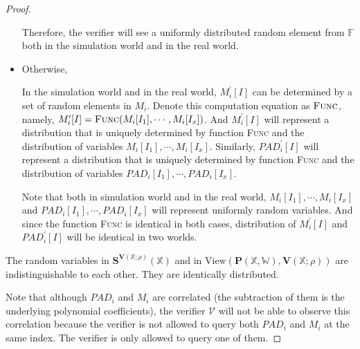 \begin{proof}
\begin{itemize}
    Therefore, the verifier will see a uniformly distributed random element from $\mathbb{F}$ both in the simulation world and in the real world.
    
    \item Otherwise,
    
    In the simulation world and in the real world, $M_i^\prime[I]$ can be determined by a set of random elements in $M_i$. Denote this computation equation as $\textsc{Func}$, namely, $M_i^\prime[I] = \textsc{Func}(M_i[I_1], \cdots, M_i[I_x])$. And $M_i^\prime[I]$ will represent a distribution that is uniquely determined by function \textsc{Func} and the distribution of variables $M_i[I_1], \cdots, M_i[I_x]$. Similarly, $PAD_i^\prime[I]$ will represent a distribution that is uniquely determined by function \textsc{Func} and the distribution of variables $PAD_i[I_1], \cdots, PAD_i[I_x]$.
    
    Note that both in simulation world and in the real world, $M_i[I_1], \cdots, M_i[I_x]$ and $PAD_i[I_1], \cdots, PAD_i[I_x]$ will represent uniformly random variables. And since the function \textsc{Func} is identical in both cases, distribution of $M_i^\prime[I]$ and $PAD_i^\prime[I]$ will be identical in two worlds.
    
    
\end{itemize}



The random variables in $\textbf{S}^{\textbf{V}(\mathbb{X};\rho)}(\mathbb{X})$ and in $\text{View}(\textbf{P}(\mathbb{X}, \mathbb{W}), \textbf{V}(\mathbb{X};\rho))$ are indistinguishable to each other. They are identically distributed.

Note that although $PAD_i$ and $M_i$ are correlated (the subtraction of them is the underlying polynomial coefficients), the verifier $\mathcal{V}$ will not be able to observe this correlation because the verifier is not allowed to query both $PAD_i$ and $M_i$ at the same index. The verifier is only allowed to query one of them.

\end{proof}